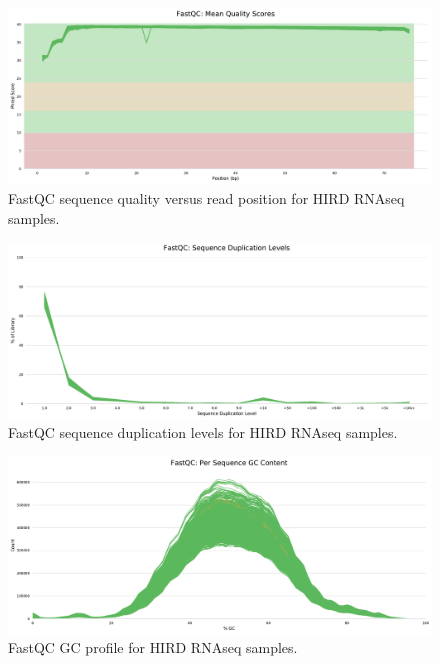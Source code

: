 \begin{figure}
	\centering
	\includegraphics[width=\textwidth]{mainmatter/figures/chapter_02/graphics_firstYearReport/fastqc/mqc_fastqc_per_base_sequence_quality_plot_1.pdf}
    \caption{FastQC sequence quality versus read position for \gls{HIRD} \gls{RNAseq} samples.}
	\label{fig:hird_fastqc_seqQual}
\end{figure}

\begin{figure}
	\centering
	\includegraphics[width=\textwidth]{mainmatter/figures/chapter_02/graphics_firstYearReport/fastqc/mqc_fastqc_sequence_duplication_levels_plot_1.pdf}
	\caption{FastQC sequence duplication levels for \gls{HIRD} \gls{RNAseq} samples.}
	\label{fig:hird_fastqc_seqDupe}
\end{figure}

\begin{figure}
	\centering
	\includegraphics[width=\textwidth]{mainmatter/figures/chapter_02/graphics_firstYearReport/fastqc/mqc_fastqc_per_sequence_gc_content_plot_Counts.pdf}
	\caption{FastQC GC profile for \gls{HIRD} \gls{RNAseq} samples.}
	\label{fig:fastqc_gc}
\end{figure}

